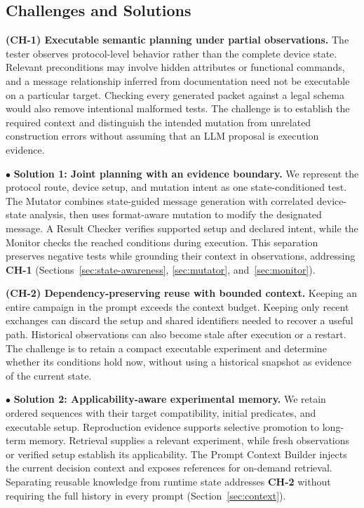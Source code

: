 \documentclass[10pt,journal,compsoc]{IEEEtran}
\begin{document}
\subsection{Challenges and Solutions}\label{sec:challenges}
\noindent \textbf{(CH-1) Executable semantic planning under partial observations.}
The tester observes protocol-level behavior rather than the complete device state. Relevant preconditions may involve hidden attributes or functional commands, and a message relationship inferred from documentation need not be executable on a particular target. Checking every generated packet against a legal schema would also remove intentional malformed tests. The challenge is to establish the required context and distinguish the intended mutation from unrelated construction errors without assuming that an LLM proposal is execution evidence.

\noindent $\bullet$ \textbf{Solution 1: Joint planning with an evidence boundary.}
We represent the protocol route, device setup, and mutation intent as one state-conditioned test. The Mutator combines state-guided message generation with correlated device-state analysis, then uses format-aware mutation to modify the designated message. A Result Checker verifies supported setup and declared intent, while the Monitor checks the reached conditions during execution. This separation preserves negative tests while grounding their context in observations, addressing \textbf{CH-1} (Sections~\ref{sec:state-awareness}, \ref{sec:mutator}, and~\ref{sec:monitor}).

\noindent \textbf{(CH-2) Dependency-preserving reuse with bounded context.}
Keeping an entire campaign in the prompt exceeds the context budget. Keeping only recent exchanges can discard the setup and shared identifiers needed to recover a useful path. Historical observations can also become stale after execution or a restart. The challenge is to retain a compact executable experiment and determine whether its conditions hold now, without using a historical snapshot as evidence of the current state.

\noindent $\bullet$ \textbf{Solution 2: Applicability-aware experimental memory.}
We retain ordered sequences with their target compatibility, initial predicates, and executable setup. Reproduction evidence supports selective promotion to long-term memory. Retrieval supplies a relevant experiment, while fresh observations or verified setup establish its applicability. The Prompt Context Builder injects the current decision context and exposes references for on-demand retrieval. Separating reusable knowledge from runtime state addresses \textbf{CH-2} without requiring the full history in every prompt (Section~\ref{sec:context}).
\end{document}
